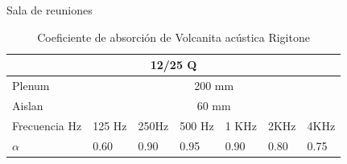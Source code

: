 \documentclass{sintefbeamer}
\begin{document}
\begin{frame}{Sala de reuniones}
    \begin{table}[H]
    \centering
    \begin{tabular}{|lllllll|}
    \hline
    \multicolumn{7}{|c|}{\textbf{12/25 Q}} \\ \hline
    \multicolumn{1}{|l|}{Plenum} & \multicolumn{6}{c|}{200 mm} \\ \hline
    \multicolumn{1}{|l|}{Aislan} & \multicolumn{6}{c|}{60  mm} \\ \hline
    \multicolumn{1}{|l|}{Frecuencia Hz} & \multicolumn{1}{l|}{125 Hz} & \multicolumn{1}{l|}{250Hz} & \multicolumn{1}{l|}{500 Hz} & \multicolumn{1}{l|}{1 KHz} & \multicolumn{1}{l|}{2KHz} & 4KHz \\ \hline
    \multicolumn{1}{|l|}{$\alpha$} & \multicolumn{1}{l|}{0.60} & \multicolumn{1}{l|}{0.90} & \multicolumn{1}{l|}{0.95} & \multicolumn{1}{l|}{0.90} & \multicolumn{1}{l|}{0.80} & 0.75 \\ \hline
    \end{tabular}
    \caption{Coeficiente de absorción de Volcanita acústica Rigitone}
    \end{table}  

\end{frame}
\end{document}

